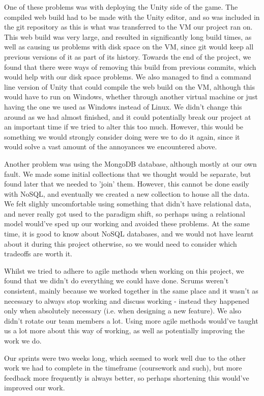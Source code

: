 One of these problems was with deploying the Unity side of the game. The
compiled web build had to be made with the Unity editor, and so was included in
the git repository as this is what was transferred to the VM our project ran on.
This web build was very large, and resulted in significantly long build times,
as well as causing us problems with disk space on the VM, since git would keep
all previous versions of it as part of its history. Towards the end of the
project, we found that there were ways of removing this build from previous
commits, which would help with our disk space problems. We also managed to find
a command line version of Unity that could compile the web build on the VM,
although this would have to run on Windows, whether through another virtual
machine or just having the one we used as Windows instead of Linux. We didn't
change this around as we had almost finished, and it could potentially break our
project at an important time if we tried to alter this too much. However, this
would be something we would strongly consider doing were we to do it again,
since it would solve a vast amount of the annoyances we encountered above.

Another problem was using the MongoDB database, although mostly at our own
fault. We made some initial collections that we thought would be separate, but
found later that we needed to 'join' them. However, this cannot be done easily
with NoSQL, and eventually we created a new collection to house all the data. We
felt slighly uncomfortable using something that didn't have relational data, and
never really got used to the paradigm shift, so perhaps using a relational model
would've sped up our working and avoided these problems. At the same time, it is
good to know about NoSQL databases, and we would not have learnt about it during
this project otherwise, so we would need to consider which tradeoffs are worth
it.

Whilst we tried to adhere to agile methods when working on this project, we
found that we didn't do everything we could have done. Scrums weren't
consistent, mainly because we worked together in the same place and it wasn't as
necessary to always stop working and discuss working - instead they happened
only when absolutely necessary (i.e. when designing a new feature). We also
didn't rotate our team members a lot. Using more agile methods would've taught
us a lot more about this way of working, as well as potentially improving the
work we do.

Our sprints were two weeks long, which seemed to work well due to the other work
we had to complete in the timeframe (coursework and such), but more feedback
more frequently is always better, so perhaps shortening this would've improved
our work.

